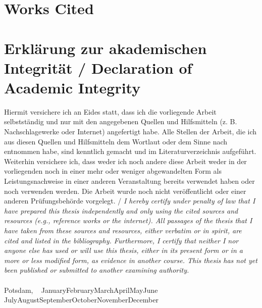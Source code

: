 \documentclass[12pt,a4paper]{article}
\newcommand{\MonthName}{%
  \ifcase\month
  \or January\or February\or March\or April\or May\or June%
  \or July\or August\or September\or October\or November\or December%
  \fi
}
\newcommand{\DateDDMonthYYYY}{\number\day~\MonthName~\number\year}
\begin{document}
\clearpage
\section*{Works Cited}
\printbibliography


\clearpage
\section*{Erklärung zur akademischen Integrität / Declaration of Academic Integrity}
Hiermit versichere ich an Eides statt, dass ich die vorliegende Arbeit selbstständig und nur mit den angegebenen Quellen und Hilfsmitteln (z. B. Nachschlagewerke oder Internet) angefertigt habe. Alle Stellen der Arbeit, die ich aus diesen Quellen und Hilfsmitteln dem Wortlaut oder dem Sinne nach entnommen habe, sind kenntlich gemacht und im Literaturverzeichnis aufgeführt. Weiterhin versichere ich, dass weder ich noch andere diese Arbeit weder in der vorliegenden noch in einer mehr oder weniger abgewandelten Form als Leistungsnachweise in einer anderen Veranstaltung bereits verwendet haben oder noch verwenden werden. Die Arbeit wurde noch nicht veröffentlicht oder einer anderen Prüfungsbehörde vorgelegt. / \emph{I hereby certify under penalty of law that I have prepared this thesis independently and only using the cited sources and resources (e.g., reference works or the internet). All passages of the thesis that I have taken from these sources and resources, either verbatim or in spirit, are cited and listed in the bibliography. Furthermore, I certify that neither I nor anyone else has used or will use this thesis, either in its present form or in a more or less modified form, as evidence in another course. This thesis has not yet been published or submitted to another examining authority.} \\
\\
Potsdam, \DateDDMonthYYYY
\end{document}
